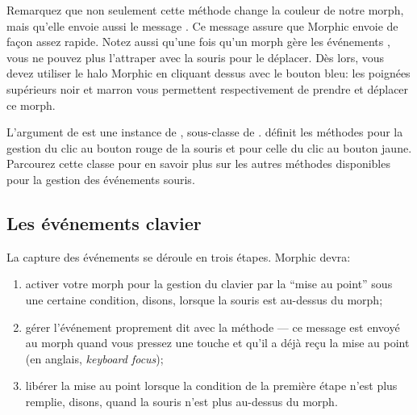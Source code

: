 \documentclass[a4paper,10pt,twoside]{book}
\begin{document}
Remarquez que non seulement cette méthode change la couleur de notre
morph, mais qu'elle envoie aussi le message .
Ce message assure que Morphic envoie 
de façon assez rapide.
Notez aussi qu'une fois qu'un morph gère les événements , vous ne pouvez plus l'attraper avec la souris pour le déplacer.
Dès lors, vous devez utiliser le halo Morphic en cliquant dessus avec le
bouton bleu: les poignées supérieurs noir \grabHandle{}
et marron \moveHandle{} 
vous permettent respectivement de prendre et déplacer ce morph.

L'argument  de  est une instance de
\mbox{,} sous-classe de .
 définit les méthodes
 pour la gestion du clic au
bouton rouge de la souris et 
pour celle du clic au bouton jaune. Parcourez cette classe pour
en savoir plus sur les autres méthodes disponibles pour la gestion
des événements souris.

\subsection{Les événements clavier}

La capture des événements  se déroule en trois
étapes. Morphic devra:


\begin{enumerate}
	\item activer votre morph pour la gestion du clavier par la ``mise
      au point'' sous une certaine condition, disons, lorsque la souris est au-dessus du morph; 
	\item gérer l'événement proprement dit avec la méthode
       --- ce message est envoyé au
      morph quand vous pressez une touche et qu'il a déj\`a reçu
      la mise au point  (en anglais, \emph{keyboard focus});
	\item libérer la mise au point lorsque la condition de la
      première étape n'est plus remplie, disons, quand la souris
      n'est plus au-dessus du morph.
\end{enumerate}
\end{document}
